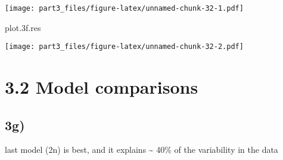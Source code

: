 \documentclass[]{article}
\newenvironment{Shaded}{\begin{snugshade}}{\end{snugshade}}
\newcommand{\FloatTok}[1]{\textcolor[rgb]{0.00,0.00,0.81}{#1}}
\newcommand{\NormalTok}[1]{#1}
\begin{document}
\texttt{[image: part3\_files/figure-latex/unnamed-chunk-32-1.pdf]}

\begin{Shaded}
\begin{Highlighting}[]
\NormalTok{plot}\FloatTok{.3}\NormalTok{f.res}
\end{Highlighting}
\end{Shaded}

\texttt{[image: part3\_files/figure-latex/unnamed-chunk-32-2.pdf]}

\hypertarget{model-comparisons}{%
\section{3.2 Model comparisons}\label{model-comparisons}}

\hypertarget{g}{%
\subsection{3g)}\label{g}}

last model (2n) is best, and it explains \textasciitilde{} 40\% of the
variability in the data
\end{document}
